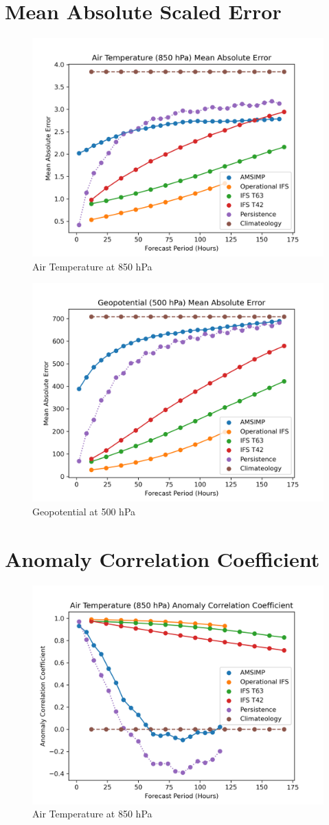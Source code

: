 \section{Mean Absolute Scaled Error}
\begin{figure}[H]
    \centering
    \includegraphics[width=.7\linewidth]{Plots/Results/Temperature/mean_absolute_error.png}
    \caption{Air Temperature at 850 hPa}
\end{figure}

\begin{figure}[H]
    \centering
    \includegraphics[width=.7\linewidth]{Plots/Results/Geopotential/mean_absolute_error.png}
    \caption{Geopotential at 500 hPa}
\end{figure}

\section{Anomaly Correlation Coefficient}
\begin{figure}[H]
    \centering
    \includegraphics[width=.7\linewidth]{Plots/Results/Temperature/anomaly_correlation_coefficient.png}
    \caption{Air Temperature at 850 hPa}
\end{figure}

